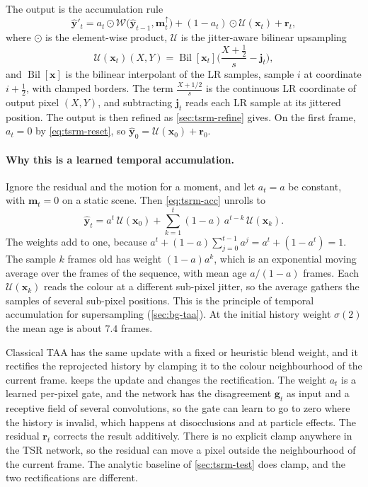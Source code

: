 The output is the accumulation rule
\begin{equation}\label{eq:tsrm-acc}
\hat{\mathbf{y}}'_t=a_t\odot\mathcal{W}\big(\hat{\mathbf{y}}_{t-1},\mathbf{m}_t^{\uparrow}\big)+(1-a_t)\odot\mathcal{U}(\mathbf{x}_t)+\mathbf{r}_t,
\end{equation}
where $\odot$ is the element-wise product, $\mathcal{U}$ is the jitter-aware bilinear upsampling
\begin{equation}\label{eq:tsrm-up}
\mathcal{U}(\mathbf{x}_t)(X,Y)=\operatorname{Bil}[\mathbf{x}_t]\Big(\frac{X+\tfrac12}{s}-\mathbf{j}_t\Big),
\end{equation}
and $\operatorname{Bil}[\mathbf{x}]$ is the bilinear interpolant of the LR samples, sample $i$ at coordinate $i+\tfrac12$, with clamped borders. The term $\frac{X+1/2}{s}$ is the continuous LR coordinate of output pixel $(X,Y)$, and subtracting $\mathbf{j}_t$ reads each LR sample at its jittered position. The output is then refined as \cref{sec:tsrm-refine} gives. On the first frame, $a_t=0$ by \cref{eq:tsrm-reset}, so $\hat{\mathbf{y}}_0=\mathcal{U}(\mathbf{x}_0)+\mathbf{r}_0$.

\paragraph{Why this is a learned temporal accumulation.} Ignore the residual and the motion for a moment, and let $a_t=a$ be constant, with $\mathbf{m}_t=0$ on a static scene. Then \cref{eq:tsrm-acc} unrolls to
\begin{equation}\label{eq:tsrm-unroll}
\hat{\mathbf{y}}_t=a^{t}\,\mathcal{U}(\mathbf{x}_0)+\sum_{k=1}^{t}(1-a)\,a^{t-k}\,\mathcal{U}(\mathbf{x}_k).
\end{equation}
The weights add to one, because $a^t+(1-a)\sum_{j=0}^{t-1}a^j=a^t+(1-a^t)=1$. The sample $k$ frames old has weight $(1-a)a^{k}$, which is an exponential moving average over the frames of the sequence, with mean age $a/(1-a)$ frames. Each $\mathcal{U}(\mathbf{x}_k)$ reads the colour at a different sub-pixel jitter, so the average gathers the samples of several sub-pixel positions. This is the principle of temporal accumulation for supersampling \cite{yang2020taasurvey} (\cref{sec:bg-taa}). At the initial history weight $\sigma(2)$ the mean age is about $7.4$ frames.

Classical TAA has the same update with a fixed or heuristic blend weight, and it rectifies the reprojected history by clamping it to the colour neighbourhood of the current frame.  keeps the update and changes the rectification. The weight $a_t$ is a learned per-pixel gate, and the network has the disagreement $\mathbf{g}_t$ as input and a receptive field of several convolutions, so the gate can learn to go to zero where the history is invalid, which happens at disocclusions and at particle effects. The residual $\mathbf{r}_t$ corrects the result additively. There is no explicit clamp anywhere in the TSR network, so the residual can move a pixel outside the neighbourhood of the current frame. The analytic baseline of \cref{sec:tsrm-test} does clamp, and the two rectifications are different.

